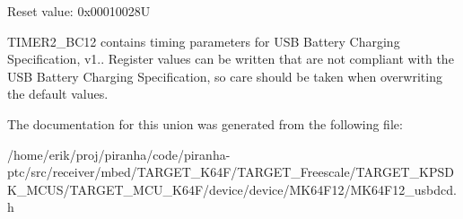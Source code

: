 Reset value\+: 0x00010028U

T\+I\+M\+E\+R2\+\_\+\+B\+C12 contains timing parameters for U\+SB Battery Charging Specification, v1.. Register values can be written that are not compliant with the U\+SB Battery Charging Specification, so care should be taken when overwriting the default values. 

The documentation for this union was generated from the following file\+:\begin{DoxyCompactItemize}
\item 
/home/erik/proj/piranha/code/piranha-\/ptc/src/receiver/mbed/\+T\+A\+R\+G\+E\+T\+\_\+\+K64\+F/\+T\+A\+R\+G\+E\+T\+\_\+\+Freescale/\+T\+A\+R\+G\+E\+T\+\_\+\+K\+P\+S\+D\+K\+\_\+\+M\+C\+U\+S/\+T\+A\+R\+G\+E\+T\+\_\+\+M\+C\+U\+\_\+\+K64\+F/device/device/\+M\+K64\+F12/M\+K64\+F12\+\_\+usbdcd.\+h\end{DoxyCompactItemize}
